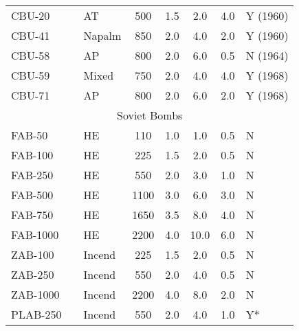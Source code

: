 \begin{twocolumntablefloat}
\begin{twocolumntable}
\begin{tabular}{lclccccl}
CBU-20  &   &AT     &\phantom{0}500&1.5&\phantom{0}2.0&\phantom{0}4.0&Y (1960)\\
CBU-41  &   &Napalm &\phantom{0}850&2.0&\phantom{0}4.0&\phantom{0}2.0&Y (1960)\\
CBU-58  &   &AP     &\phantom{0}800&2.0&\phantom{0}6.0&\phantom{0}0.5&N (1964)\\
CBU-59  &   &Mixed  &\phantom{0}750&2.0&\phantom{0}4.0&\phantom{0}4.0&Y (1968)\\
CBU-71  &   &AP     &\phantom{0}800&2.0&\phantom{0}6.0&\phantom{0}2.0&Y (1968)\\
\midrule
\multicolumn{8}{c}{Soviet    Bombs}\\
\midrule
FAB-50  &   &HE     &\phantom{0}110&1.0&\phantom{0}1.0&\phantom{0}0.5&N\\
FAB-100 &   &HE     &\phantom{0}225&1.5&\phantom{0}2.0&\phantom{0}0.5&N\\
FAB-250 &   &HE     &\phantom{0}550&2.0&\phantom{0}3.0&\phantom{0}1.0&N\\
FAB-500 &   &HE     &\phantom{}1100&3.0&\phantom{0}6.0&\phantom{0}3.0&N\\
FAB-750 &   &HE     &\phantom{}1650&3.5&\phantom{0}8.0&\phantom{0}4.0&N\\
FAB-1000&   &HE     &\phantom{}2200&4.0&\phantom{}10.0&\phantom{0}6.0&N\\
ZAB-100 &   &Incend &\phantom{0}225&1.5&\phantom{0}2.0&\phantom{0}0.5&N\\
ZAB-250 &   &Incend &\phantom{0}550&2.0&\phantom{0}4.0&\phantom{0}0.5&N\\
ZAB-1000&   &Incend &\phantom{}2200&4.0&\phantom{0}8.0&\phantom{0}2.0&N\\
PLAB-250&   &Incend &\phantom{0}550&2.0&\phantom{0}4.0&\phantom{0}1.0&Y*\\
\bottomrule
\end{tabular}
\end{twocolumntable}
\end{twocolumntablefloat}